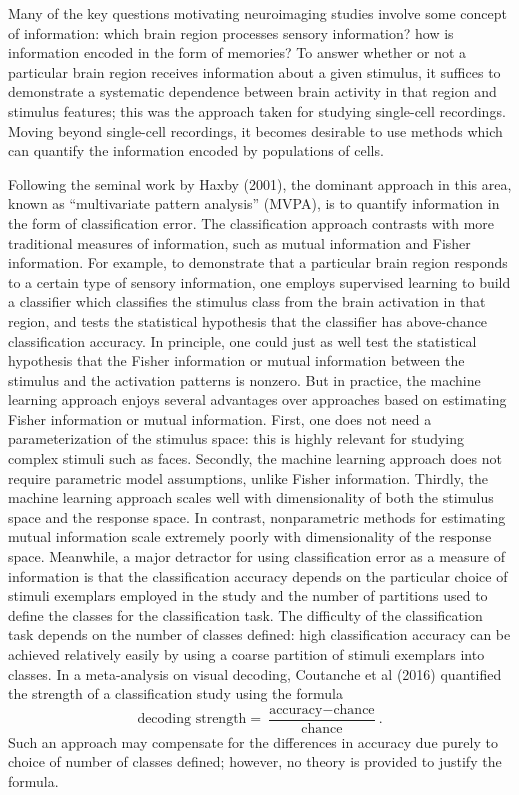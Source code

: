 \documentclass[12pt]{article}
\begin{document}
Many of the key questions motivating neuroimaging studies involve some concept of information:
which brain region processes sensory information?  how is information encoded in the form of memories?
To answer whether or not a particular brain region receives information about a given stimulus,
it suffices to demonstrate a systematic dependence between brain activity in that region and stimulus features;
this was the approach taken for studying single-cell recordings.
Moving beyond single-cell recordings, it becomes desirable to use methods which can quantify
the information encoded by populations of cells.

Following the seminal work by Haxby (2001), the dominant approach in this area,
known as ``multivariate pattern analysis'' (MVPA), is to quantify information in the form of classification error.
The classification approach contrasts with more traditional measures of information, such as mutual information and Fisher information.
For example, to demonstrate that a particular brain region responds to a certain type of sensory information,
one employs supervised learning to build a classifier which classifies the stimulus class from the brain activation in that region,
and tests the statistical hypothesis that the classifier has above-chance classification accuracy.
In principle, one could just as well test the statistical hypothesis that the Fisher information or mutual information between
the stimulus and the activation patterns is nonzero.  But in practice, the machine learning approach enjoys several advantages over
approaches based on estimating Fisher information or mutual information.
First, one does not need a parameterization of the stimulus space: this is highly relevant for studying complex stimuli such as faces.
Secondly, the machine learning approach does not require parametric model assumptions, unlike Fisher information.
Thirdly, the machine learning approach scales well with dimensionality of both the stimulus space and the response space.
In contrast, nonparametric methods for estimating mutual information scale extremely poorly with dimensionality of the response space.
Meanwhile, a major detractor for using classification error as a measure of information is that the classification accuracy depends on the particular choice of stimuli exemplars employed in the study and the number of partitions used to define the classes for the classification task.
The difficulty of the classification task depends on the number of classes defined: high classification accuracy can be achieved relatively easily by using a coarse partition of stimuli exemplars into classes.
In a meta-analysis on visual decoding, Coutanche et al (2016) quantified the strength of a classification study
using the formula
\[
\text{decoding strength} = \frac{\text{accuracy} - \text{chance}}{\text{chance}}.
\]
Such an approach may compensate for the differences in accuracy due purely to choice of number of classes defined;
however, no theory is provided to justify the formula.
\end{document}
